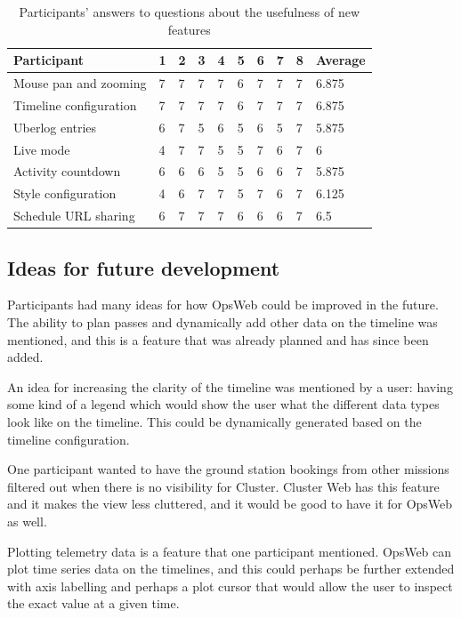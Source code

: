 \begin{table}[!h]
\def\arraystretch{1.1}%
    \begin{center}
    \caption{Participants' answers to questions about the usefulness of new features}
    \label{features_usefulness}
    \begin{tabular}{| l | l | l | l | l | l | l | l | l | l | }
    \hline
    Participant & 1 & 2 & 3 & 4 & 5 & 6 & 7 & 8 & Average  \\
    \hline
    Mouse pan and zooming    & 7  & 7 & 7 & 7 & 6 & 7 & 7 & 7 & 6.875   \\
    Timeline configuration    & 7  & 7 & 7 & 7 & 6 & 7 & 7 & 7 & 6.875    \\
    Uberlog entries    &  6 & 7 & 5 & 6 & 5 & 6 & 5 & 7 & 5.875   \\
    Live mode    & 4  & 7 & 7 & 5 & 5 & 7 & 6 & 7 & 6   \\
    Activity countdown    & 6  & 6 & 6 & 5 & 5 & 6 & 6 & 7 & 5.875   \\
    Style configuration    & 4  & 6 & 7 & 7 & 5 & 7 & 6 & 7 & 6.125   \\
    Schedule URL sharing    & 6  & 7 & 7 & 7 & 6 & 6 & 6 & 7 & 6.5   \\
    \hline
    \end{tabular}
    \end{center}
\end{table}

\subsection{Ideas for future development}
Participants had many ideas for how OpsWeb could be improved in the future. The ability to plan passes and dynamically add other data on the timeline was mentioned, and this is a feature that was already planned and has since been added.

An idea for increasing the clarity of the timeline was mentioned by a user: having some kind of a legend which would show the user what the different data types look like on the timeline. This could be dynamically generated based on the timeline configuration.

One participant wanted to have the ground station bookings from other missions filtered out when there is no visibility for Cluster. Cluster Web has this feature and it makes the view less cluttered, and it would be good to have it for OpsWeb as well.

Plotting telemetry data is a feature that one participant mentioned. OpsWeb can plot time series data on the timelines, and this could perhaps be further extended with axis labelling and perhaps a plot cursor that would allow the user to inspect the exact value at a given time.

